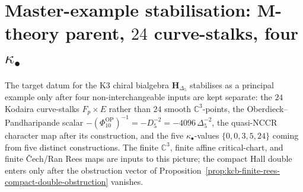 \section{Master-example stabilisation: M-theory parent, \texorpdfstring{$24$}{24} curve-stalks, four \texorpdfstring{$\kappa_\bullet$}{kappa-bullet}}
\label{sec:k3-chiral-bialgebra-master-stabilisation}

The target datum for the K3 chiral bialgebra
$\mathbf{H}_{\Delta_5}$ stabilises as a principal example only after four
non-interchangeable inputs are kept separate:
the $24$ Kodaira curve-stalks \(F_p\times E\) rather than \(24\) smooth
\(\mathbb C^3\)-points, the Oberdieck--Pandharipande scalar
\(-(\Phi_{10}^{\mathrm{OP}})^{-1}=-D_5^{-2}=-4096\,\Delta_5^{-2}\),
the quasi-NCCR character map after its construction, and the five
\(\kappa_\bullet\)-values
\(\{0,0,3,5,24\}\) coming from five distinct constructions. The finite
\(\mathbb C^3\), finite affine critical-chart, and finite \v{C}ech/Ran
Rees maps are inputs to this picture; the compact Hall double enters
only after the obstruction vector of
Proposition~\ref{prop:kcb-finite-rees-compact-double-obstruction}
vanishes.

